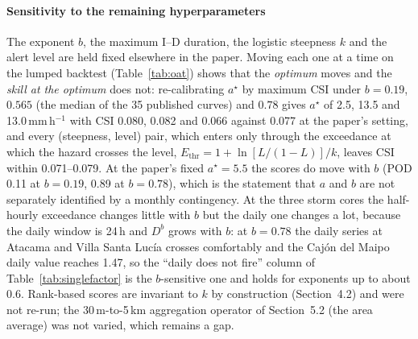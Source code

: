 \documentclass[authoryear,preprint,review,12pt]{elsarticle}
\begin{document}
\paragraph{Sensitivity to the remaining hyperparameters}
The exponent $b$, the maximum I--D duration, the logistic steepness $k$ and the alert level are held fixed elsewhere in the paper. Moving each one at a time on the lumped backtest (Table~\ref{tab:oat}) shows that the \emph{optimum} moves and the \emph{skill at the optimum} does not: re-calibrating $a^\star$ by maximum CSI under $b=0.19$, $0.565$ (the median of the 35 published curves) and $0.78$ gives $a^\star$ of 2.5, 13.5 and 13.0\,mm\,h$^{-1}$ with CSI 0.080, 0.082 and 0.066 against 0.077 at the paper's setting, and every (steepness, level) pair, which enters only through the exceedance at which the hazard crosses the level, $E_\mathrm{thr}=1+\ln[L/(1-L)]/k$, leaves CSI within 0.071--0.079. At the paper's fixed $a^\star=5.5$ the scores do move with $b$ (POD 0.11 at $b=0.19$, 0.89 at $b=0.78$), which is the statement that $a$ and $b$ are not separately identified by a monthly contingency. At the three storm cores the half-hourly exceedance changes little with $b$ but the daily one changes a lot, because the daily window is 24\,h and $D^b$ grows with $b$: at $b=0.78$ the daily series at Atacama and Villa Santa Luc\'ia crosses comfortably and the Caj\'on del Maipo daily value reaches 1.47, so the ``daily does not fire'' column of Table~\ref{tab:singlefactor} is the $b$-sensitive one and holds for exponents up to about 0.6. Rank-based scores are invariant to $k$ by construction (Section~4.2) and were not re-run; the 30\,m-to-5\,km aggregation operator of Section~5.2 (the area average) was not varied, which remains a gap.
\end{document}
